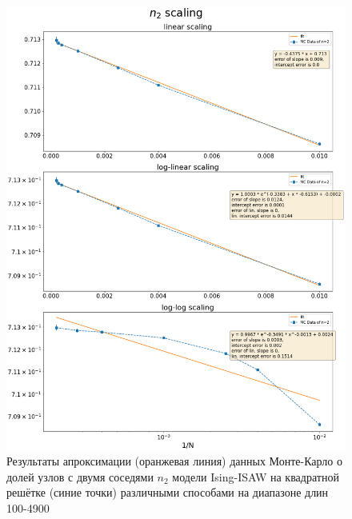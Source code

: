 \begin{figure}[h!]

\begin{minipage}{0.49\textwidth}
    \includegraphics[width=\textwidth]{Sections/Images/square_n2_scaling.png}
    \caption{Результаты апроксимации (оранжевая линия) данных Монте-Карло о долей узлов с двумя соседями $n_2$ модели Ising-ISAW на квадратной решётке (синие точки) различными способами на диапазоне длин 100-4900}
    \label{fig:square_scale_full}
\end{minipage}
\hfill
\begin{minipage}{0.49\textwidth}

\end{minipage}
\end{figure}
